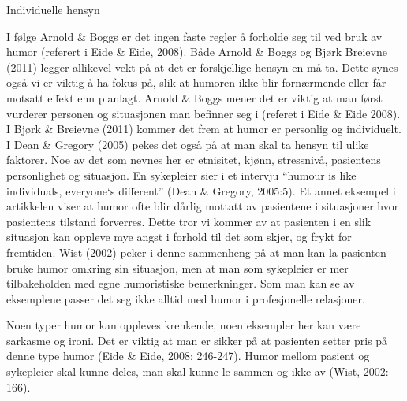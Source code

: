 Individuelle hensyn

I følge Arnold \&{} Boggs er det ingen faste regler å forholde seg til ved bruk av
humor (referert i Eide \&{} Eide, 2008). Både Arnold \&{} Boggs og Bjørk Breievne
(2011) legger allikevel vekt på at det er forskjellige hensyn en må ta. Dette
synes også vi er viktig å ha fokus på, slik at humoren ikke blir fornærmende
eller får motsatt effekt enn planlagt. Arnold \&{} Boggs mener det er viktig at
man først vurderer personen og situasjonen man befinner seg i (referet i Eide \&
Eide 2008). I Bjørk \&{} Breievne (2011) kommer det frem at humor er personlig og
individuelt. I Dean \&{} Gregory (2005) pekes det også på at man skal ta hensyn
til ulike faktorer. Noe av det som nevnes her er etnisitet, kjønn, stressnivå,
pasientens personlighet og situasjon. En sykepleier sier i et intervju “humour
is like individuals, everyone`s different” (Dean \&{} Gregory, 2005:5). Et annet
eksempel i artikkelen viser at humor ofte blir dårlig mottatt av pasientene i
situasjoner hvor pasientens tilstand forverres. Dette tror vi kommer av at
pasienten i en slik situasjon kan oppleve mye angst i forhold til det som
skjer, og frykt for fremtiden. Wist (2002) peker i denne sammenheng på at man
kan la pasienten bruke humor omkring sin situasjon, men at man som sykepleier
er mer tilbakeholden med egne humoristiske bemerkninger. Som man kan se av
eksemplene passer det seg ikke alltid med humor i profesjonelle relasjoner.

Noen typer humor kan oppleves krenkende, noen eksempler her kan være sarkasme
og ironi. Det er viktig at man er sikker på at pasienten setter pris på denne
type humor (Eide \&{} Eide, 2008: 246-247). Humor mellom pasient og sykepleier
skal kunne deles, man skal kunne le sammen og ikke av (Wist, 2002: 166).

